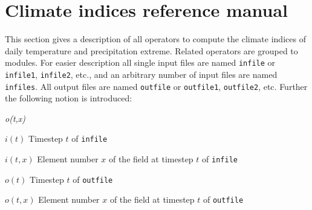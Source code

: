 \chapter{\label{refman}Climate indices reference manual}

This section gives a description of all {\CDO} operators to compute the climate indices of daily temperature and precipitation extreme.
Related operators are grouped to modules.
For easier description all single input files are named \texttt{infile} or \texttt{infile1}, \texttt{infile2}, etc.,
and an arbitrary number of input files are named \texttt{infiles}.
All output files are named \texttt{outfile} or \texttt{outfile1}, \texttt{outfile2}, etc.
Further the following notion is introduced:
\begin{defalist}{{\em o(t,x)}}
\item[\(i(t)\)\hfill]
Timestep \(t\) of \texttt{infile}
\item[\(i(t,x)\)\hfill]
Element number \(x\) of the field at timestep \(t\) of \texttt{infile}
\item[\(o(t)\)\hfill]
Timestep \(t\) of \texttt{outfile}
\item[\(o(t,x)\)\hfill]
Element number \(x\) of the field at timestep \(t\) of \texttt{outfile}
\end{defalist}



\hspace{3mm}

%



